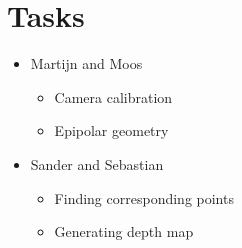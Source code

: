 \documentclass[a4paper]{article}
\begin{document}
\section{Tasks}
  \begin{itemize}
    \item Martijn and Moos
    \begin{itemize}
      \item Camera calibration
      \item Epipolar geometry
    \end{itemize}
    \item Sander and Sebastian
    \begin{itemize}
      \item Finding corresponding points
      \item Generating depth map
    \end{itemize}
  \end{itemize}



\end{document}
